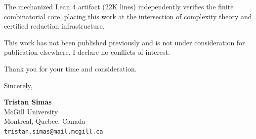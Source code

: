 \documentclass[10pt]{article}
\begin{document}
The mechanized Lean 4 artifact (22K lines) independently verifies the finite combinatorial core, placing this work at the intersection of complexity theory and certified reduction infrastructure.

This work has not been published previously and is not under consideration for publication elsewhere. I declare no conflicts of interest.

\noindent Thank you for your time and consideration.

\noindent Sincerely,

\vspace{0.3cm}

\noindent\textbf{Tristan Simas} \\
McGill University \\
Montreal, Quebec, Canada \\
\texttt{tristan.simas@mail.mcgill.ca}
\end{document}
